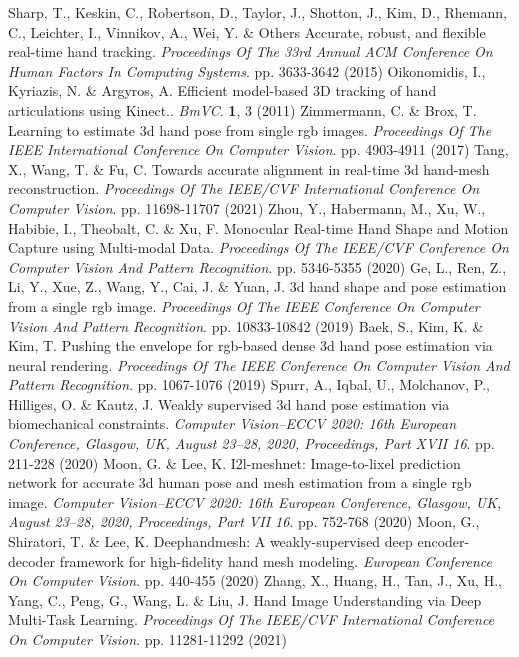 \documentclass{article}
\begin{document}
\begin{thebibliography}{00}
Sharp, T., Keskin, C., Robertson, D., Taylor, J., Shotton, J., Kim, D., Rhemann, C., Leichter, I., Vinnikov, A., Wei, Y. \& Others Accurate, robust, and flexible real-time hand tracking. {\em Proceedings Of The 33rd Annual ACM Conference On Human Factors In Computing Systems}. pp. 3633-3642 (2015)
Oikonomidis, I., Kyriazis, N. \& Argyros, A. Efficient model-based 3D tracking of hand articulations using Kinect.. {\em BmVC}. \textbf{1}, 3 (2011)
Zimmermann, C. \& Brox, T. Learning to estimate 3d hand pose from single rgb images. {\em Proceedings Of The IEEE International Conference On Computer Vision}. pp. 4903-4911 (2017)
Tang, X., Wang, T. \& Fu, C. Towards accurate alignment in real-time 3d hand-mesh reconstruction. {\em Proceedings Of The IEEE/CVF International Conference On Computer Vision}. pp. 11698-11707 (2021)
Zhou, Y., Habermann, M., Xu, W., Habibie, I., Theobalt, C. \& Xu, F. Monocular Real-time Hand Shape and Motion Capture using Multi-modal Data. {\em Proceedings Of The IEEE/CVF Conference On Computer Vision And Pattern Recognition}. pp. 5346-5355 (2020)
Ge, L., Ren, Z., Li, Y., Xue, Z., Wang, Y., Cai, J. \& Yuan, J. 3d hand shape and pose estimation from a single rgb image. {\em Proceedings Of The IEEE Conference On Computer Vision And Pattern Recognition}. pp. 10833-10842 (2019)
Baek, S., Kim, K. \& Kim, T. Pushing the envelope for rgb-based dense 3d hand pose estimation via neural rendering. {\em Proceedings Of The IEEE Conference On Computer Vision And Pattern Recognition}. pp. 1067-1076 (2019)
Spurr, A., Iqbal, U., Molchanov, P., Hilliges, O. \& Kautz, J. Weakly supervised 3d hand pose estimation via biomechanical constraints. {\em Computer Vision–ECCV 2020: 16th European Conference, Glasgow, UK, August 23–28, 2020, Proceedings, Part XVII 16}. pp. 211-228 (2020)
Moon, G. \& Lee, K. I2l-meshnet: Image-to-lixel prediction network for accurate 3d human pose and mesh estimation from a single rgb image. {\em Computer Vision–ECCV 2020: 16th European Conference, Glasgow, UK, August 23–28, 2020, Proceedings, Part VII 16}. pp. 752-768 (2020)
Moon, G., Shiratori, T. \& Lee, K. Deephandmesh: A weakly-supervised deep encoder-decoder framework for high-fidelity hand mesh modeling. {\em European Conference On Computer Vision}. pp. 440-455 (2020)
Zhang, X., Huang, H., Tan, J., Xu, H., Yang, C., Peng, G., Wang, L. \& Liu, J. Hand Image Understanding via Deep Multi-Task Learning. {\em Proceedings Of The IEEE/CVF International Conference On Computer Vision}. pp. 11281-11292 (2021)

\end{thebibliography}
\end{document}
